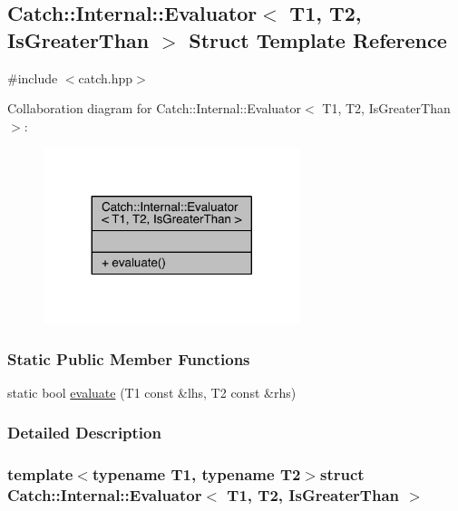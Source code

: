 \hypertarget{a00020}{}\subsection{Catch\+:\+:Internal\+:\+:Evaluator$<$ T1, T2, Is\+Greater\+Than $>$ Struct Template Reference}
\label{a00020}


{\ttfamily \#include $<$catch.\+hpp$>$}



Collaboration diagram for Catch\+:\+:Internal\+:\+:Evaluator$<$ T1, T2, Is\+Greater\+Than $>$\+:\nopagebreak
\begin{figure}[H]
\begin{center}
\leavevmode
\includegraphics[width=212pt]{a00312}
\end{center}
\end{figure}
\subsubsection*{Static Public Member Functions}
\begin{DoxyCompactItemize}
\item 
static bool \hyperlink{a00020_a55745f74f09ac5c61bd3d592ca5560af}{evaluate} (T1 const \&lhs, T2 const \&rhs)
\end{DoxyCompactItemize}


\subsubsection{Detailed Description}
\subsubsection*{template$<$typename T1, typename T2$>$struct Catch\+::\+Internal\+::\+Evaluator$<$ T1, T2, Is\+Greater\+Than $>$}



